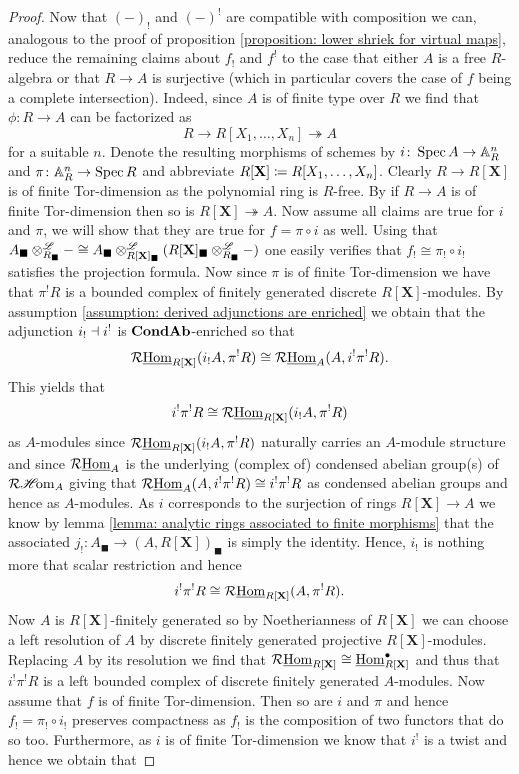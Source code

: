 \begin{proof}
	Now that $(-)_!$ and $(-)^!$ are compatible with composition we can, analogous to the proof of proposition \ref{proposition: lower shriek for virtual maps}, reduce the remaining claims about $f_!$ and $f^!$ to the case that either $A$ is a free $R$-algebra or that $R\to A$ is surjective (which in particular covers the case of $f$ being a complete intersection). Indeed, since $A$ is of finite type over $R$ we find that $\phi\colon R\to A$ can be factorized as
		$$R \to R[X_1, \dots, X_n] \twoheadrightarrow A$$
	for a suitable $n$. Denote the resulting morphisms of schemes by $i\colon \operatorname{Spec} A\to {\mathbb{A}}_R^n$ and $\pi\colon {\mathbb{A}}_R^n \to \operatorname{Spec} R$ and abbreviate $R[\mathbf{X}] \coloneqq R[X_1,\dots, X_n]$. Clearly $R\to R[\mathbf{X}]$ is of finite Tor-dimension as the polynomial ring is $R$-free. By \cite[\href{https://stacks.math.columbia.edu/tag/0B66}{Tag 0B66}]{stacks-project} if $R\to A$ is of finite Tor-dimension then so is $R[\mathbf{X}]\twoheadrightarrow A$. Now assume all claims are true for $i$ and $\pi$, we will show that they are true for $f = \pi\circ i$ as well. Using that $A_\blacksquare\otimes^{\mathscr{L}}_{R_\blacksquare} - \cong A_\blacksquare \otimes^{\mathscr{L}}_{R[\mathbf{X}]_\blacksquare}(R[\mathbf{X}]_\blacksquare\otimes^{\mathscr{L}}_{R_\blacksquare} -) $ one easily verifies that $f_!\cong\pi_!\circ i_!$ satisfies the projection formula. Now since $\pi$ is of finite Tor-dimension we have that $\pi^! R$ is a bounded complex of finitely generated discrete $R[\mathbf{X}]$-modules. By assumption \ref{assumption: derived adjunctions are enriched} we obtain that the adjunction $i_!\dashv i^!$ is ${{{\mathbf{Cond}}}{{\mathbf{Ab}}}}$-enriched so that
		$$\mathcal{R}{\underline{\operatorname{Hom}}}_{R[\mathbf{X}]}(i_!A, \pi^!R)\cong \mathcal{R}{\underline{\operatorname{Hom}}}_A(A, i^!\pi^!R).$$
	This yields that
		$$i^!\pi^!R \cong \mathcal{R}{\underline{\operatorname{Hom}}}_{R[\mathbf{X}]}(i_!A, \pi^!R)$$
	as $A$-modules since $\mathcal{R}{\underline{\operatorname{Hom}}}_{R[\mathbf{X}]}(i_!A, \pi^!R)$ naturally carries an $A$-module structure and since $\mathcal{R}{\underline{\operatorname{Hom}}}_A$ is the underlying (complex of) condensed abelian group(s) of $\mathcal{R}{\operatorname{\mathscr{H}\!om}}_A$ giving that $\mathcal{R}{\underline{\operatorname{Hom}}}_A(A, i^!\pi^! R) \cong i^!\pi^!R$ as condensed abelian groups and hence as $A$-modules. As $i$ corresponds to the surjection of rings $R[\mathbf{X}]\to A$ we know by lemma \ref{lemma: analytic rings associated to finite morphisms} that the associated $j_!\colon A_\blacksquare\to (A, R[\mathbf{X}])_\blacksquare$ is simply the identity. Hence, $i_!$ is nothing more that scalar restriction and hence
		$$i^!\pi^!R\cong \mathcal{R}{\underline{\operatorname{Hom}}}_{R[\mathbf{X}]}(A, \pi^!R).$$
	Now $A$ is $R[\mathbf{X}]$-finitely generated so by Noetherianness of $R[\mathbf{X}]$ we can choose a left resolution of $A$ by discrete finitely generated projective $R[\mathbf{X}]$-modules. Replacing $A$ by its resolution we find that $\mathcal{R}{\underline{\operatorname{Hom}}}_{R[\mathbf{X}]}\cong {\underline{\operatorname{Hom}}}_{R[\mathbf{X}]}^\bullet$ and thus that $i^!\pi^!R$ is a left bounded complex of discrete finitely generated $A$-modules. Now assume that $f$ is of finite Tor-dimension. Then so are $i$ and $\pi$ and hence $f_! = \pi_!\circ i_!$ preserves compactness as $f_!$ is the composition of two functors that do so too. Furthermore, as $i$ is of finite Tor-dimension we know that $i^!$ is a twist and hence we obtain that

\end{proof}
